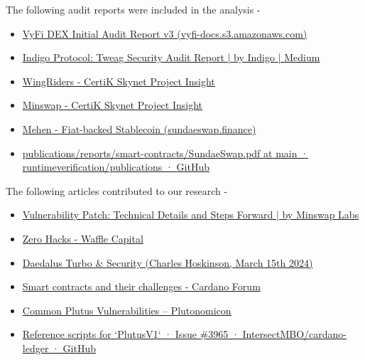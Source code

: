 \documentclass{scrreport}
\begin{document}
The following audit reports were included in the analysis - 
\begin{itemize}
    \item \href{https://vyfi-docs.s3.amazonaws.com/initial-audit-report.pdf}{VyFi DEX Initial Audit Report v3 (vyfi-docs.s3.amazonaws.com)}
    \item \href{https://indigoprotocol1.medium.com/indigo-protocol-tweag-security-audit-report-949b3c359f17}{Indigo Protocol: Tweag Security Audit Report | by Indigo | Medium}
    \item \href{https://skynet.certik.com/projects/wingriders}{WingRiders - CertiK Skynet Project Insight}
    \item \href{https://skynet.certik.com/projects/minswap}{Minswap - CertiK Skynet Project Insight}
    \item \href{https://cdn.sundaeswap.finance/audits/mehen.pdf}{Mehen - Fiat-backed Stablecoin (sundaeswap.finance)}
    \item \href{https://github.com/runtimeverification/publications/blob/main/reports/smart-contracts/SundaeSwap.pdf}{publications/reports/smart-contracts/SundaeSwap.pdf at main · runtimeverification/publications · GitHub}
\end{itemize}

The following articles contributed to our research - 
\begin{itemize}
    \item \href{https://minswap-labs.medium.com/vulnerability-patch-technical-details-and-steps-forward-97f6ee35aa91}{Vulnerability Patch: Technical Details and Steps Forward | by Minswap Labs}
    \item \href{https://www.wafflecapital.xyz/blog/zero-hacks}{Zero Hacks - Waffle Capital}
    \item \href{https://m.youtube.com/watch?v=RnshfdRwTSI}{Daedalus Turbo \& Security (Charles Hoskinson, March 15th 2024)}
    \item \href{https://forum.cardano.org/t/smart-contracts-and-their-challenges/54870}{Smart contracts and their challenges - Cardano Forum}
    \item \href{https://plutonomicon.github.io/plutonomicon/vulnerabilities}{Common Plutus Vulnerabilities – Plutonomicon}
    \item \href{https://github.com/IntersectMBO/cardano-ledger/issues/3965}{Reference scripts for `PlutusV1` · Issue \#3965 · IntersectMBO/cardano-ledger · GitHub}
\end{itemize}
\end{document}
